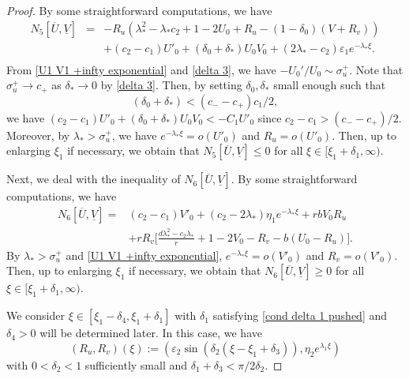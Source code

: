 \documentclass[11pt,a4paper]{article}
\numberwithin{equation}{section}
\numberwithin{figure}{section}
\newcommand\bea{\begin{eqnarray}}
\newcommand\eea{\end{eqnarray}}
\newcommand\beaa{\begin{eqnarray*}}
\newcommand\eeaa{\end{eqnarray*}}
\begin{document}
\begin{proof}


By some  straightforward computations,  we have
\beaa
N_5[\overline U,\underline V]&=&-R_u(\lambda_*^2-\lambda_*c_2+1-2U_0+R_u-(1-\delta_0)(V+R_v))\\
&&+(c_2-c_1)U'_0+(\delta_0+\delta_*)U_0V_0+(2\lambda_*-c_2)\varepsilon_1e^{-\lambda_*\xi}.\\
\eeaa
From \eqref{U1 V1 +infty exponential} and \eqref{delta 3}, we have $-U_0'/U_0\sim \sigma_u^+$. Note that 
$\sigma_u^+\to c_+$ as $\delta_*\to 0$ by \eqref{delta 3}. Then, by setting $\delta_0,\delta_*$ small enough such that
$$(\delta_0+\delta_*)<(c_--c_+)c_1/2,$$
 we have $(c_2-c_1)U'_0+(\delta_0+\delta_*)U_0V_0<-C_1U'_0$ since $c_2-c_1>(c_--c_+)/2$. 
Moreover, by $\lambda_*>\sigma_u^+$, we have $e^{-\lambda_*\xi}=o(U'_0)$ and $R_u=o(U'_0)$.
Then, up to enlarging $\xi_1$ if necessary, we obtain that $N_5[\overline U,\underline V]\leq0$
for all $\xi\in[\xi_1+\delta_1,\infty)$.


Next, we deal with the inequality of $N_6[\overline U, \underline V]$. By some  straightforward computations,  we have
\begin{equation*}
\begin{aligned}
N_6[\overline U, \underline V] = & (c_2-c_1)V'_0+(c_2-2\lambda_*)\eta_1e^{-\lambda_*\xi}+rbV_0R_u\\
&+ rR_v\Big[\frac{d\lambda_*^2-c_2\lambda_*}{r}+1-2V_0-R_v-b(U_0-R_u)\Big].
\end{aligned}
\end{equation*}
 By $\lambda_*>\sigma_u^+$ and \eqref{U1 V1 +infty exponential}, $e^{-\lambda_*\xi}=o(V'_0)$ and $R_v=o(V'_0)$. Then, up to enlarging $\xi_1$ if necessary, we obtain that $N_6[\overline U,\underline V]\geq0$
for all $\xi\in[\xi_1+\delta_1,\infty)$.


\medskip


 We consider $\xi\in[\xi_1-\delta_4,\xi_1+\delta_1]$ with $\delta_1$ satisfying \eqref{cond delta 1 pushed} and $\delta_4>0$ will be determined later. In this case, we have
$$(R_u,R_v)(\xi):=(\varepsilon_2\sin(\delta_2(\xi-\xi_1+\delta_3)),\eta_2e^{\lambda_{1}\xi})$$
with $0<\delta_2<1$ sufficiently small and $\delta_1+\delta_3<\pi/2\delta_2$.



\end{proof}
\end{document}
